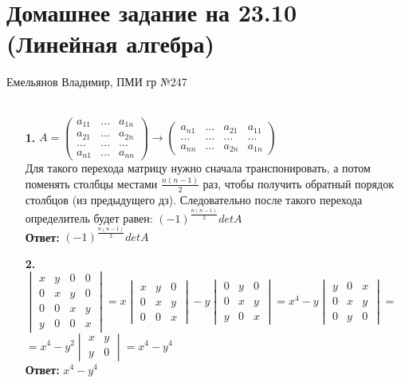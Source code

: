 \documentclass[a4paper]{article}
\newcommand{\mat}[1]{\begin{pmatrix} #1 \end{pmatrix}}
\renewcommand{\det}[1]{\begin{vmatrix} #1 \end{vmatrix}}
\renewcommand{\f}[2]{\frac{#1}{#2}}
\begin{document}
\section*{Домашнее задание на 23.10 (Линейная алгебра)}
 {\large Емельянов Владимир, ПМИ гр №247}\\\\
\begin{enumerate}
    \item[\textbf{1.}]$A = \mat{a_{11} & \dots & a_{1n} \\ a_{21} & \dots & a_{2n} \\ \dots & \dots & \dots \\ a_{n1} & \dots & a_{nn}} \to \mat{a_{n1} & \dots & a_{21} & a_{11} \\ \dots & \dots & \dots & \dots \\ a_{nn} & \dots & a_{2n} &  a_{1n}}$\\
          Для такого перехода матрицу нужно сначала транспонировать, а потом поменять столбцы местами $\f{n(n-1)}{2}$ раз, чтобы получить обратный порядок столбцов (из предыдущего дз).
          Следовательно после такого перехода определитель будет равен: $(-1)^{\f{n(n-1)}{2}}detA$\\
          \textbf{Ответ: } $(-1)^{\f{n(n-1)}{2}}detA$\\

    \item[\textbf{2.}]$\det{x & y & 0 & 0 \\ 0 & x & y & 0 \\ 0 & 0 & x & y \\ y & 0 & 0 & x} = x\det{x & y & 0 \\ 0 & x & y \\ 0 & 0 & x} - y\det{0 & y & 0 \\0 & x &y \\ y &0 &x} = x^4-y\det{ y &0 &x \\0 & x &y \\ 0 & y & 0} =$ \\
          $= x^4 - y^2\det{x & y \\ y & 0} = x^4 - y^4$\\
          \textbf{Ответ: } $x^4 - y^4$\\


\end{enumerate}
\end{document}
